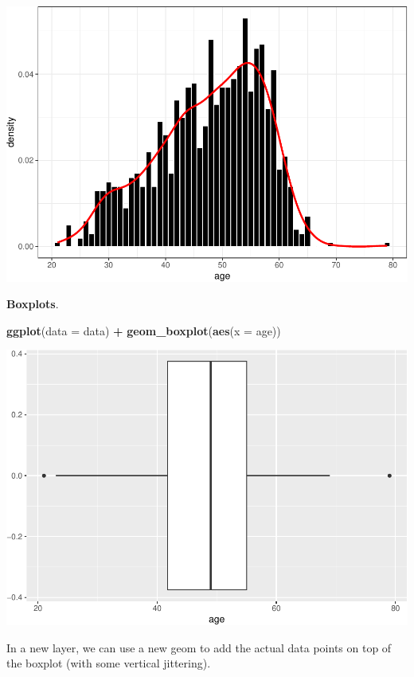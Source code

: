 \documentclass[
]{book}
\newenvironment{Shaded}{\begin{snugshade}}{\end{snugshade}}
\newcommand{\AttributeTok}[1]{\textcolor[rgb]{0.13,0.29,0.53}{#1}}
\newcommand{\FunctionTok}[1]{\textcolor[rgb]{0.13,0.29,0.53}{\textbf{#1}}}
\newcommand{\NormalTok}[1]{#1}
\newcommand{\SpecialCharTok}[1]{\textcolor[rgb]{0.81,0.36,0.00}{\textbf{#1}}}
\begin{document}
\includegraphics{R-for-social-research-and-business-analytics_files/figure-latex/unnamed-chunk-22-1.pdf}

\textbf{Boxplots}.

\begin{Shaded}
\begin{Highlighting}[]
\FunctionTok{ggplot}\NormalTok{(}\AttributeTok{data =}\NormalTok{ data) }\SpecialCharTok{+}
  \FunctionTok{geom\_boxplot}\NormalTok{(}\FunctionTok{aes}\NormalTok{(}\AttributeTok{x =}\NormalTok{ age))}
\end{Highlighting}
\end{Shaded}

\includegraphics{R-for-social-research-and-business-analytics_files/figure-latex/unnamed-chunk-23-1.pdf}

In a new layer, we can use a new geom to add the actual data points on top of the boxplot (with some vertical jittering).
\end{document}
